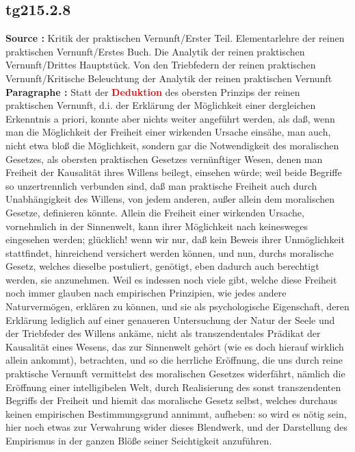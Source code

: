 \documentclass[a4paper,12pt,twoside]{book}
\newcommand{\match}[1]{\textcolor{red}{\textbf{#1}}}
\begin{document}
	\subsection*{tg215.2.8} 
	\textbf{Source : }Kritik der praktischen Vernunft/Erster Teil. Elementarlehre der reinen praktischen Vernunft/Erstes Buch. Die Analytik der reinen praktischen Vernunft/Drittes Hauptstück. Von den Triebfedern der reinen praktischen Vernunft/Kritische Beleuchtung der Analytik der reinen praktischen Vernunft\\  
	
	\noindent\textbf{Paragraphe : }Statt der \match{Deduktion} des obersten Prinzips der reinen praktischen Vernunft, d.i. der Erklärung der Möglichkeit einer dergleichen Erkenntnis a priori, konnte aber nichts weiter angeführt werden, als daß, wenn man die Möglichkeit der Freiheit einer wirkenden Ursache einsähe, man auch, nicht etwa bloß die Möglichkeit, sondern gar die Notwendigkeit des moralischen Gesetzes, als obersten praktischen Gesetzes vernünftiger Wesen, denen man Freiheit der Kausalität ihres Willens beilegt, einsehen würde; weil beide Begriffe so unzertrennlich verbunden sind, daß man praktische Freiheit auch durch Unabhängigkeit des Willens, von jedem anderen, außer allein dem moralischen Gesetze, definieren könnte. Allein die Freiheit einer wirkenden Ursache, vornehmlich in der Sinnenwelt, kann ihrer Möglichkeit nach keinesweges eingesehen werden; glücklich! wenn wir nur, daß kein Beweis ihrer Unmöglichkeit stattfindet, hinreichend versichert werden können, und nun, durchs moralische Gesetz, welches dieselbe postuliert, genötigt, eben dadurch auch berechtigt werden, sie anzunehmen. Weil es indessen noch viele gibt, welche diese Freiheit noch immer glauben nach empirischen Prinzipien, wie jedes andere Naturvermögen, erklären zu können, und sie als psychologische Eigenschaft, deren Erklärung lediglich auf einer genaueren Untersuchung der Natur der Seele und der Triebfeder des Willens ankäme, nicht als transzendentales Prädikat der Kausalität eines Wesens, das zur Sinnenwelt  gehört (wie es doch hierauf wirklich allein ankommt), betrachten, und so die herrliche Eröffnung, die uns durch reine praktische Vernunft vermittelst des moralischen Gesetzes widerfährt, nämlich die Eröffnung einer intelligibelen Welt, durch Realisierung des sonst transzendenten Begriffs der Freiheit und hiemit das moralische Gesetz selbst, welches durchaus keinen empirischen Bestimmungsgrund annimmt, aufheben: so wird es nötig sein, hier noch etwas zur Verwahrung wider dieses Blendwerk, und der Darstellung des Empirismus in der ganzen Blöße seiner Seichtigkeit anzuführen. 
	
\end{document}
